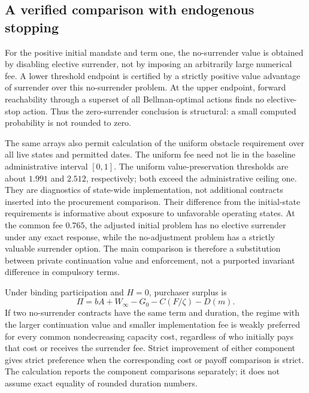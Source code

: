 \subsection{A verified comparison with endogenous stopping}
For the positive initial mandate and term one, the no-surrender value is obtained by disabling elective surrender, not by imposing an arbitrarily large numerical fee. A lower threshold endpoint is certified by a strictly positive value advantage of surrender over this no-surrender problem. At the upper endpoint, forward reachability through a superset of all Bellman-optimal actions finds no elective-stop action. Thus the zero-surrender conclusion is structural: a small computed probability is not rounded to zero.



The same arrays also permit calculation of the uniform obstacle requirement over all live states and permitted dates. The uniform fee need not lie in the baseline administrative interval $[0,1]$. The uniform value-preservation thresholds are about $1.991$ and $2.512$, respectively; both exceed the administrative ceiling one. They are diagnostics of state-wide implementation, not additional contracts inserted into the procurement comparison. Their difference from the initial-state requirements is informative about exposure to unfavorable operating states. At the common fee $0.765$, the adjusted initial problem has no elective surrender under any exact response, while the no-adjustment problem has a strictly valuable surrender option. The main comparison is therefore a substitution between private continuation value and enforcement, not a purported invariant difference in compulsory terms.

Under binding participation and $H=0$, purchaser surplus is
\begin{equation}
 \Pi=bA+W_\infty-G_0-C(F/\zeta)-D(m).
 \label{eq:nosurrenderprofit}
\end{equation}
If two no-surrender contracts have the same term and duration, the regime with the larger continuation value and smaller implementation fee is weakly preferred for every common nondecreasing capacity cost, regardless of who initially pays that cost or receives the surrender fee. Strict improvement of either component gives strict preference when the corresponding cost or payoff comparison is strict. The calculation reports the component comparisons separately; it does not assume exact equality of rounded duration numbers.

